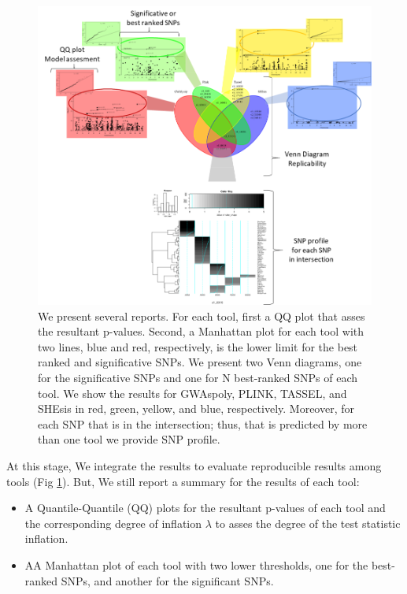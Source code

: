 \begin{figure}
\includegraphics[width=15cm]{images/Reportes_Metodologia.png}
\caption{We present several reports. For each tool, first a QQ plot that asses the resultant p-values.  Second, a Manhattan plot for each tool with two lines, blue and red, respectively, is the lower limit for the best ranked and significative SNPs. We present two Venn diagrams, one for the significative SNPs and one for N best-ranked SNPs of each tool. We show the results for GWAspoly, PLINK, TASSEL, and SHEsis in red, green, yellow, and blue, respectively. Moreover, for each SNP that is in the intersection; thus, that is predicted by more than one tool we provide SNP profile. \label{reports}}

\end{figure}

At this stage, We integrate the results to evaluate reproducible results among tools (Fig \ref{reports}). But, We still report a summary for the results of each tool:
\begin{itemize}
    \item A Quantile-Quantile (QQ) plots for the resultant p-values of each tool and the corresponding degree of inflation $\lambda$ to asses the degree of the test statistic inflation.
    \item AA Manhattan plot of each tool with two lower thresholds, one for the best-ranked SNPs, and another for the significant SNPs. 
\end{itemize}

